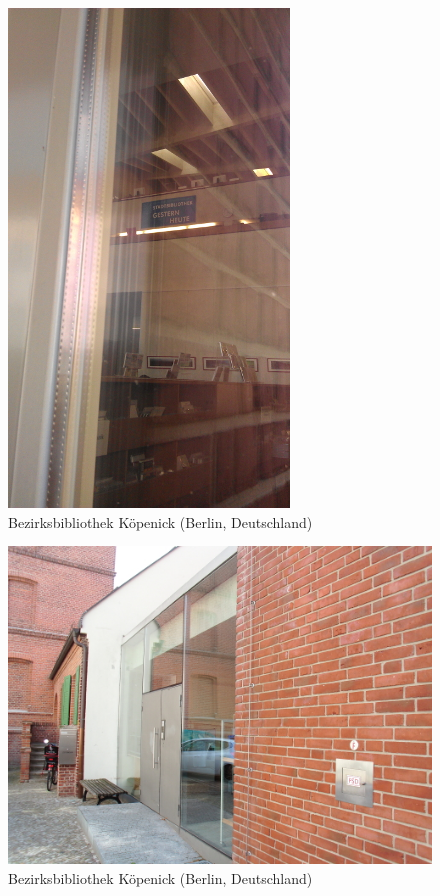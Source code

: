 \documentclass[a4paper,
fontsize=11pt,
oneside,
numbers=noperiodatend,
parskip=half-,
bibliography=totoc,
final
]{scrartcl}
\begin{document}
\begin{figure}[htbp]
\centering
\includegraphics{./img/056.jpg}
\caption{Bezirksbibliothek Köpenick (Berlin,
Deutschland)}
\end{figure}

\begin{figure}[htbp]
\centering
\includegraphics{./img/057.jpg}
\caption{Bezirksbibliothek Köpenick (Berlin,
Deutschland)}
\end{figure}
\end{document}
